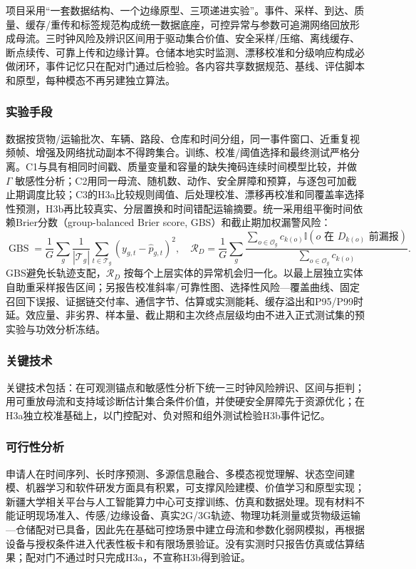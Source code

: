 项目采用“一套数据结构、一个边缘原型、三项递进实验”。事件、采样、到达、质量、缓存/重传和标签规范构成统一数据底座，可控异常与参数可追溯网络回放形成母流。三时钟风险及辨识区间用于驱动集合价值、安全采样/压缩、离线缓存、断点续传、可靠上传和边缘计算。仓储本地实时监测、漂移校准和分级响应构成必做闭环，事件记忆只在配对门通过后检验。各内容共享数据规范、基线、评估脚本和原型，每种模态不再另建独立算法。

\subsubsection{实验手段}

数据按货物/运输批次、车辆、路段、仓库和时间分组，同一事件窗口、近重复视频帧、增强及网络扰动副本不得跨集合。训练、校准/阈值选择和最终测试严格分离。C1与具有相同时间戳、质量变量和容量的缺失掩码连续时间模型比较，并做 \(\Gamma\) 敏感性分析；C2用同一母流、随机数、动作、安全屏障和预算，与逐包可加截止期调度比较；C3的H3a比较规则阈值、后处理校准、漂移再校准和同覆盖率选择性预测，H3b再比较真实、分层置换和时间错配运输摘要。统一采用组平衡时间依赖Brier分数（group-balanced Brier score, GBS）和截止期加权漏警风险：
\[
\operatorname{GBS}=\frac1G\sum_g\frac1{|\mathcal T_g|}\sum_{t\in\mathcal T_g}(y_{g,t}-\hat p_{g,t})^2,\quad
\mathcal R_D=\frac1G\sum_g\frac{\sum_{o\in\mathcal O_g}c_{k(o)}\mathbb I(o\text{ 在 }D_{k(o)}\text{ 前漏报})}{\sum_{o\in\mathcal O_g}c_{k(o)}}.
\tag{7}
\]
GBS避免长轨迹支配，\(\mathcal R_D\) 按每个上层实体的异常机会归一化。以最上层独立实体自助重采样报告区间；另报告校准斜率/可靠性图、选择性风险—覆盖曲线、固定召回下误报、证据链交付率、通信字节、估算或实测能耗、缓存溢出和P95/P99时延。效应量、非劣界、样本量、截止期和主次终点层级均由不进入正式测试集的预实验与功效分析冻结。

\subsubsection{关键技术}

关键技术包括：在可观测锚点和敏感性分析下统一三时钟风险辨识、区间与拒判；用可重放母流和支持域诊断估计集合条件价值，并使硬安全屏障先于资源优化；在H3a独立校准基础上，以门控配对、负对照和组外测试检验H3b事件记忆。

\subsubsection{可行性分析}

申请人在时间序列、长时序预测、多源信息融合、多模态视觉理解、状态空间建模、机器学习和软件研发方面具有积累，可支撑风险建模、价值学习和原型实现；新疆大学相关平台与人工智能算力中心可支撑训练、仿真和数据处理。现有材料不能证明现场准入、传感/边缘设备、真实2G/3G轨迹、物理功耗测量或货物级运输—仓储配对已具备，因此先在基础可控场景中建立母流和参数化弱网模拟，再根据设备与授权条件进入代表性板卡和有限场景验证。没有实测时只报告仿真或估算结果；配对门不通过时只完成H3a，不宣称H3b得到验证。
